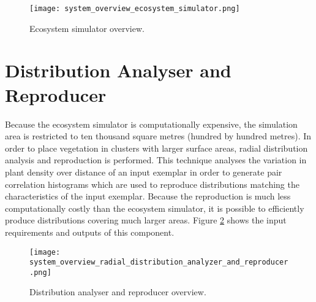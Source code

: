 \begin{figure}
\center
	\texttt{[image: system\_overview\_ecosystem\_simulator.png]}
	\caption{ Ecosystem simulator overview.}	
	\label{fig:system_overview_ecosystem_simulator}
\end{figure}

\section{Distribution Analyser and Reproducer}

Because the ecosystem simulator is computationally expensive, the simulation area is restricted to ten thousand square metres (hundred by hundred metres). In order to place vegetation in clusters with larger surface areas, radial distribution analysis and reproduction is performed. This technique analyses the variation in plant density over distance of an input exemplar in order to generate pair correlation histograms which are used to reproduce distributions matching the characteristics of the input exemplar. Because the reproduction is much less computationally costly than the ecosystem simulator, it is possible to efficiently produce distributions covering much larger areas. Figure \ref{fig:system_overview_distribution_analyser_and_reproducer} shows the input requirements and outputs of this component.

\begin{figure}
\center
	\texttt{[image: system\_overview\_radial\_distribution\_analyzer\_and\_reproducer.png]}
	\caption{ Distribution analyser and reproducer overview.}	
	\label{fig:system_overview_distribution_analyser_and_reproducer}
\end{figure}